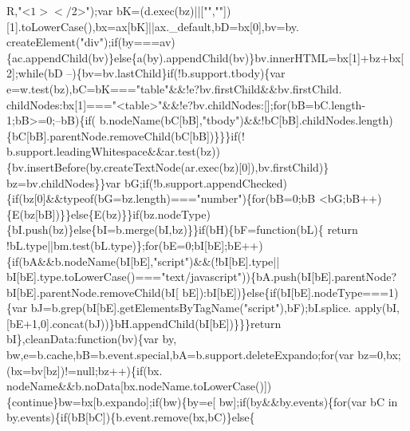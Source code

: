 \begin{DoxyCode}
      R,\textcolor{stringliteral}{"<$1></$2>"});var bK=(d.exec(bz)||[\textcolor{stringliteral}{""},\textcolor{stringliteral}{""}])[1].toLowerCase(),bx=ax[bK]||ax.\_default,bD=bx[0],bv=by.
      createElement(\textcolor{stringliteral}{"div"});\textcolor{keywordflow}{if}(by===av)\{ac.appendChild(bv)\}\textcolor{keywordflow}{else}\{a(by).appendChild(bv)\}bv.innerHTML=bx[1]+bz+bx[2];\textcolor{keywordflow}{while}(bD
      --)\{bv=bv.lastChild\}\textcolor{keywordflow}{if}(!b.support.tbody)\{var e=w.test(bz),bC=bK===\textcolor{stringliteral}{"table"}&&!e?bv.firstChild&&bv.firstChild.
      childNodes:bx[1]===\textcolor{stringliteral}{"<table>"}&&!e?bv.childNodes:[];\textcolor{keywordflow}{for}(bB=bC.length-1;bB>=0;--bB)\{\textcolor{keywordflow}{if}(
      b.nodeName(bC[bB],\textcolor{stringliteral}{"tbody"})&&!bC[bB].childNodes.length)\{bC[bB].parentNode.removeChild(bC[bB])\}\}\}\textcolor{keywordflow}{if}(!
      b.support.leadingWhitespace&&ar.test(bz))\{bv.insertBefore(by.createTextNode(ar.exec(bz)[0]),bv.firstChild)\}
      bz=bv.childNodes\}\}var bG;\textcolor{keywordflow}{if}(!b.support.appendChecked)\{\textcolor{keywordflow}{if}(bz[0]&&typeof(bG=bz.length)===\textcolor{stringliteral}{"number"})\{\textcolor{keywordflow}{for}(bB=0;bB
      <bG;bB++)\{E(bz[bB])\}\}\textcolor{keywordflow}{else}\{E(bz)\}\}\textcolor{keywordflow}{if}(bz.nodeType)\{bI.push(bz)\}\textcolor{keywordflow}{else}\{bI=b.merge(bI,bz)\}\}\textcolor{keywordflow}{if}(bH)\{bF=\textcolor{keyword}{function}(bL)\{\textcolor{keywordflow}{
      return} !bL.type||bm.test(bL.type)\};\textcolor{keywordflow}{for}(bE=0;bI[bE];bE++)\{\textcolor{keywordflow}{if}(bA&&b.nodeName(bI[bE],\textcolor{stringliteral}{"script"})&&(!bI[bE].type||
      bI[bE].type.toLowerCase()===\textcolor{stringliteral}{"text/javascript"}))\{bA.push(bI[bE].parentNode?bI[bE].parentNode.removeChild(bI[
      bE]):bI[bE])\}\textcolor{keywordflow}{else}\{\textcolor{keywordflow}{if}(bI[bE].nodeType===1)\{var bJ=b.grep(bI[bE].getElementsByTagName(\textcolor{stringliteral}{"script"}),bF);bI.splice.
      apply(bI,[bE+1,0].concat(bJ))\}bH.appendChild(bI[bE])\}\}\}\textcolor{keywordflow}{return} bI\},cleanData:\textcolor{keyword}{function}(bv)\{var by,
      bw,e=b.cache,bB=b.event.special,bA=b.support.deleteExpando;\textcolor{keywordflow}{for}(var bz=0,bx;(bx=bv[bz])!=null;bz++)\{\textcolor{keywordflow}{if}(bx.
      nodeName&&b.noData[bx.nodeName.toLowerCase()])\{\textcolor{keywordflow}{continue}\}bw=bx[b.expando];\textcolor{keywordflow}{if}(bw)\{by=e[
      bw];\textcolor{keywordflow}{if}(by&&by.events)\{\textcolor{keywordflow}{for}(var bC in by.events)\{\textcolor{keywordflow}{if}(bB[bC])\{b.event.remove(bx,bC)\}\textcolor{keywordflow}{else}\{

\end{DoxyCode}

